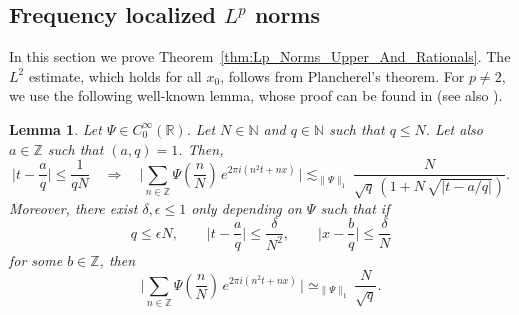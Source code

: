 \documentclass[11pt,reqno]{amsart}
\newtheorem{lem}[thm]{Lemma}
\theoremstyle{definition}
\begin{document}
\subsection{Frequency localized $L^p$ norms 
}\label{sec:Proof_Of_Lp_Norms_Localized_Rationals}
In this section we prove Theorem~\ref{thm:Lp_Norms_Upper_And_Rationals}. 
The $L^2$ estimate, which holds for all $x_0$,  
follows from Plancherel's theorem. 
For $p \neq 2$, we use the following well-known lemma, 
whose proof can be found in \cite[Lemma 3.18]{Bourgain1993} (see also \cite[Lemma 4.4]{BanicaVega2022}).
\begin{lem}\label{thm:BourgainLemma}
Let $\Psi \in C^\infty_0(\mathbb R)$. 
Let $N \in \mathbb N$ and $q \in \mathbb N$ such that $q \leq N$. 
Let also $a\in \mathbb Z$ such that $(a,q) = 1$. 
Then, 
\begin{equation}\label{eq:BourgainLemma_UpperBound}
\Big| t - \frac{a}{q} \Big| \leq \frac{1}{qN} \quad \Longrightarrow \quad \Big|  \sum_{n \in \mathbb Z} \Psi\left( \frac{n}{N} \right) \, e^{2 \pi i (n^2 t + n x)} \, \Big|  \lesssim_{\lVert \Psi \rVert_1} \frac{N}{\sqrt{q} \, \left( 1 +  N\, \sqrt{ |t -  a/q|  } \right)}.
\end{equation}
Moreover, there exist $\delta, \epsilon \leq 1$ only depending on $\Psi$ such that 
if 
\begin{equation}
q \leq \epsilon N, \qquad \Big| t - \frac{a}{q} \Big| \leq \frac{\delta}{N^2}, \qquad \Big| x - \frac{b}{q} \Big| \leq \frac{\delta}{N}
\end{equation}
for some $b \in \mathbb Z$, then
\begin{equation}\label{eq:GaussSumEstimate}
\Big|  \sum_{n \in \mathbb Z} \Psi\left( \frac{n}{N} \right) \, e^{2 \pi i (n^2 t + n x)} \, \Big| \simeq_{\lVert \Psi \rVert_1} \frac{N}{\sqrt{q}}.
\end{equation}
\end{lem} 
\end{document}
